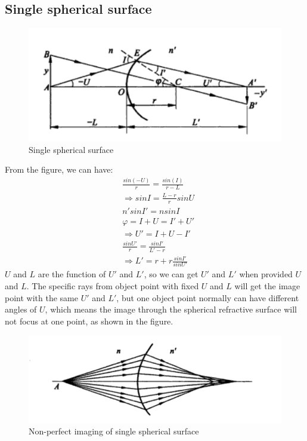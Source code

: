 \documentclass[../main.tex]{subfiles}
\begin{document}
	\subsection{Single spherical surface}
	\begin{figure}[h!]
		\centering
		\includegraphics[scale=0.7]{../graphics/Geometrical_optics5.png}
		\caption{Single spherical surface}
		\label{fig:spherical}
	\end{figure}
	From the figure, we can have:
	\begin{align}
		&\frac{sin(-U)}{r}=\frac{sin(I)}{r-L}\\
		&\Rightarrow sinI=\frac{L-r}{r}sinU\label{eq:1}\\
		&n'sinI'=nsinI\label{eq:2}\\
		&\varphi=I+U=I'+U'\\
		&\Rightarrow U'=I+U-I'\\
		&\frac{sinU'}{r}=\frac{sinI'}{L'-r}\label{eq:3}\\
		&\Rightarrow L'=r+r\frac{sinI'}{sinU'}
	\end{align}
	$U$ and $L$ are the function of $U'$ and $L'$, so we can get $U'$ and $L'$ when provided $U$ and $L$. The specific rays from object point with fixed $U$ and $L$ will get the image point with the same $U'$ and $L'$, but one object point normally can have different angles of $U$, which means the image through the spherical refractive surface will not focus at one point, as shown in the figure.
	\begin{figure}[h!]
		\centering
		\includegraphics[scale=0.7]{../graphics/Geometrical_optics6.png}
		\caption{Non-perfect imaging of single spherical surface}
		\label{fig:imperfection}
	\end{figure}
	
\end{document}
